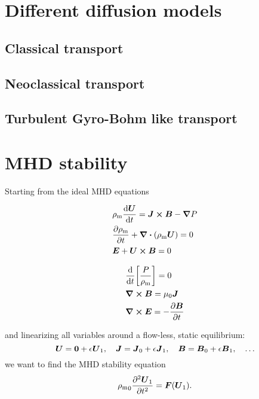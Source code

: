 \documentclass[11pt,a4paper, 
swedish, english %
]{article}
\newcommand{\rhom}{\ensuremath{{\rho_{\text{m}}}}}
\begin{document}
\section{Different diffusion models}
\subsection{Classical transport}
\subsection{Neoclassical transport}
\subsection{Turbulent Gyro-Bohm like transport}

\section{MHD stability}
Starting from the ideal MHD equations
\vspace{-22pt}
\begin{multicols}{2}
\begin{subequations}
\begin{align}
\label{eq:MHD-a}
&\rhom\dv{\vb*U}{t}=\vb*J\cross\vb*B-\grad P
\\ \label{eq:MHD-b}
&\pdv{\rhom}{t} +\div(\rhom\vb*U)=0
\\ \label{eq:MHD-c}
&\vb*E+\vb*U\cross\vb*B=0
\end{align}
\end{subequations}

\columnbreak

\addtocounter{equation}{-1}
\begin{subequations}
\addtocounter{equation}{3}
\begin{align}
\label{eq:MHD-d}
&\dv{t}\qty[\frac{P}{\rhom}]=0
\\ \label{eq:MHD-e}
&\curl\vb*B=\mu_0\vb*J %
\\ \label{eq:MHD-f}
&\curl\vb*E=-\pdv{\vb*B}{t}
\end{align}
\end{subequations}
\end{multicols}\noindent
and linearizing all variables around a flow-less, static equilibrium:
\begin{equation}
\vb*U=\vb0+\epsilon\vb*U_1 \qc
\vb*J=\vb*J_0+\epsilon\vb*J_1 \qc
\vb*B=\vb*B_0+\epsilon\vb*B_1 \qc
\ldots
\end{equation}
we want to find the MHD stability equation
\begin{equation}
\rhom_0\pdv[2]{\vb*U_1}{t}=\vb*F(\vb*U_1).
\end{equation}
\end{document}
